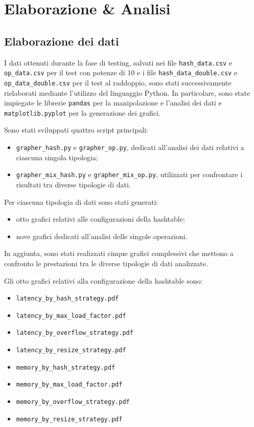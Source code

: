 \chapter{Elaborazione \& Analisi}

\section{Elaborazione dei dati}

I dati ottenuti durante la fase di testing, salvati nei file \texttt{hash\_data.csv} e \texttt{op\_data.csv} per il test con potenze di 10 e i file 
\texttt{hash\_data\_double.csv} e \texttt{op\_data\_double.csv} per il test al raddoppio, sono stati successivamente rielaborati mediante l'utilizzo 
del linguaggio Python. In particolare, sono state impiegate le librerie \texttt{pandas} per la manipolazione e l'analisi dei dati e \texttt{matplotlib.pyplot} per la generazione dei grafici.

Sono stati sviluppati quattro script principali:
\begin{itemize}
    \item \texttt{grapher\_hash.py} e \texttt{grapher\_op.py}, dedicati all'analisi dei dati relativi a ciascuna singola tipologia;
    \item \texttt{grapher\_mix\_hash.py} e \texttt{grapher\_mix\_op.py}, utilizzati per confrontare i risultati tra diverse tipologie di dati.
\end{itemize}

Per ciascuna tipologia di dati sono stati generati:
\begin{itemize}
    \item otto grafici relativi alle configurazioni della hashtable;
    \item nove grafici dedicati all'analisi delle singole operazioni.
\end{itemize}

In aggiunta, sono stati realizzati cinque grafici complessivi che mettono a confronto le prestazioni tra le diverse tipologie di dati analizzate.

Gli otto grafici relativi alla configurazione della hashtable sono:
\begin{itemize}
    \item \texttt{latency\_by\_hash\_strategy.pdf}
    \item \texttt{latency\_by\_max\_load\_factor.pdf}
    \item \texttt{latency\_by\_overflow\_strategy.pdf}
    \item \texttt{latency\_by\_resize\_strategy.pdf}
    \item \texttt{memory\_by\_hash\_strategy.pdf}
    \item \texttt{memory\_by\_max\_load\_factor.pdf}
    \item \texttt{memory\_by\_overflow\_strategy.pdf}
    \item \texttt{memory\_by\_resize\_strategy.pdf}
\end{itemize}

